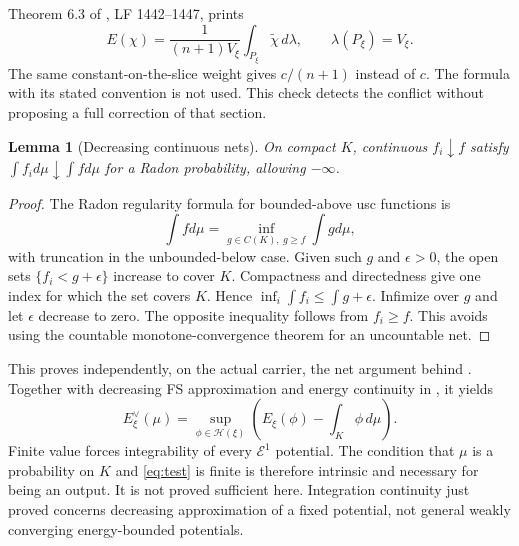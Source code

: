 \documentclass[11pt]{article}
\newcommand{\FS}{\mathcal H}
\newcommand{\EE}{\mathcal E^1}
\newtheorem{lemma}[proposition]{Lemma}
\theoremstyle{remark}
\begin{document}
Theorem 6.3 of \cite{Wu21}, LF 1442--1447, prints
\[
 E(\chi)=\frac1{(n+1)V_\xi}\int_{P_\xi}\widetilde\chi\,d\lambda,
 \qquad\lambda(P_\xi)=V_\xi.
\]
The same constant-on-the-slice weight gives $c/(n+1)$ instead of $c$. The formula with its stated convention is not used. This check detects the conflict without proposing a full correction of that section.

\begin{lemma}[Decreasing continuous nets]
On compact $K$, continuous $f_i\downarrow f$ satisfy $\int f_i d\mu\downarrow\int f d\mu$ for a Radon probability, allowing $-\infty$.
\end{lemma}
\begin{proof}
The Radon regularity formula for bounded-above usc functions is
\[
 \int f d\mu=\inf_{g\in C(K),\ g\ge f}\int g d\mu,
\]
with truncation in the unbounded-below case. Given such $g$ and $\epsilon>0$, the open sets $\{f_i<g+\epsilon\}$ increase to cover $K$. Compactness and directedness give one index for which the set covers $K$. Hence $\inf_i\int f_i\le\int g+\epsilon$. Infimize over $g$ and let $\epsilon$ decrease to zero. The opposite inequality follows from $f_i\ge f$. This avoids using the countable monotone-convergence theorem for an uncountable net.
\end{proof}

This proves independently, on the actual carrier, the net argument behind \cite[Lemma 7.17]{BJ22}. Together with decreasing FS approximation and energy continuity in \cite{Wu24}, it yields
\begin{equation}
 E^\vee_\xi(\mu)=\sup_{\phi\in\FS(\xi)}
       \left(E_\xi(\phi)-\int_K\phi\,d\mu\right).\label{eq:test}
\end{equation}
Finite value forces integrability of every $\EE$ potential. The condition that $\mu$ is a probability on $K$ and \eqref{eq:test} is finite is therefore intrinsic and necessary for being an output. It is not proved sufficient here. Integration continuity just proved concerns decreasing approximation of a fixed potential, not general weakly converging energy-bounded potentials.
\end{document}
